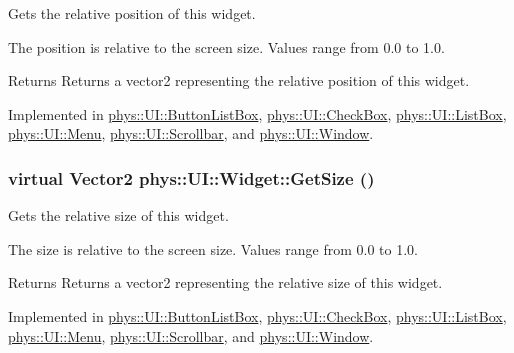 Gets the relative position of this widget. 

The position is relative to the screen size. Values range from 0.0 to 1.0. \begin{DoxyReturn}{Returns}
Returns a vector2 representing the relative position of this widget. 
\end{DoxyReturn}


Implemented in \hyperlink{classphys_1_1UI_1_1ButtonListBox_ab7834542f8940adba8df6b1eace92e95}{phys::UI::ButtonListBox}, \hyperlink{classphys_1_1UI_1_1CheckBox_a8a8630b27ab769b6e42657c5388ec7fe}{phys::UI::CheckBox}, \hyperlink{classphys_1_1UI_1_1ListBox_af688db0628a5588865a890584f754b02}{phys::UI::ListBox}, \hyperlink{classphys_1_1UI_1_1Menu_a3c19fe2596fe4049325cc580daa70387}{phys::UI::Menu}, \hyperlink{classphys_1_1UI_1_1Scrollbar_ad049af26ff2247cfcd988cb5639fa003}{phys::UI::Scrollbar}, and \hyperlink{classphys_1_1UI_1_1Window_a29fca96d9a2dab29d77a36d6a329f306}{phys::UI::Window}.

\hypertarget{classphys_1_1UI_1_1Widget_a07039c19e57de314147ce066417da0a2}{
\subsubsection[{GetSize}]{\setlength{\rightskip}{0pt plus 5cm}virtual {\bf Vector2} phys::UI::Widget::GetSize ()}}
\label{d9/d48/classphys_1_1UI_1_1Widget_a07039c19e57de314147ce066417da0a2}


Gets the relative size of this widget. 

The size is relative to the screen size. Values range from 0.0 to 1.0. \begin{DoxyReturn}{Returns}
Returns a vector2 representing the relative size of this widget. 
\end{DoxyReturn}


Implemented in \hyperlink{classphys_1_1UI_1_1ButtonListBox_a0084510b0b9c53761e5b4a45f65604ab}{phys::UI::ButtonListBox}, \hyperlink{classphys_1_1UI_1_1CheckBox_a99c6ab5087522fbd4825032b9a058585}{phys::UI::CheckBox}, \hyperlink{classphys_1_1UI_1_1ListBox_a7af2cced185d63be6a62d5122c700d81}{phys::UI::ListBox}, \hyperlink{classphys_1_1UI_1_1Menu_a81781199a62bbe7c2e7693ef301223b4}{phys::UI::Menu}, \hyperlink{classphys_1_1UI_1_1Scrollbar_aff97ce371ee21fcf3b648dcf8b38e055}{phys::UI::Scrollbar}, and \hyperlink{classphys_1_1UI_1_1Window_a9946100eb6e6e985921bbea9e87cede3}{phys::UI::Window}.

